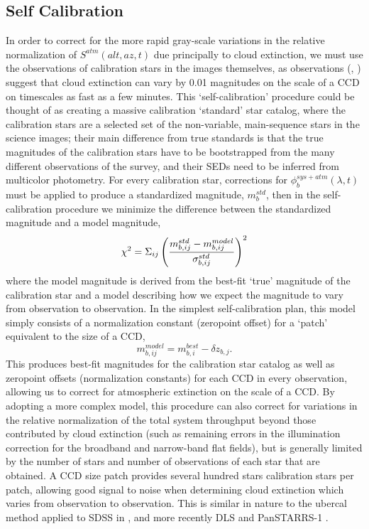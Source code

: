 \documentclass[12pt,preprint]{aastex}
\begin{document}
\subsection{Self Calibration}
In order to correct for the more rapid gray-scale variations in the
relative normalization of $S^{atm}(alt,az,t)$ due principally to cloud extinction,
we must use the observations of calibration stars in the images themselves, as
 observations (\citep{Burke13}, \citep{Ivezic2007}) suggest that cloud extinction can vary by 0.01 magnitudes on the scale of a CCD
on timescales as fast as a few minutes. This
`self-calibration' procedure could be thought of as creating a massive
calibration `standard' star catalog, where the calibration stars are
a selected set of the non-variable, main-sequence stars in the science images;
their main difference from true standards is that the true magnitudes of the calibration
stars have to be bootstrapped from the many different observations of
the survey, and their SEDs need to be inferred from multicolor photometry.
For every calibration star, corrections for
 $\phi_b^{sys+atm}(\lambda,t)$ must be
applied to produce a standardized magnitude, $m_b^{std}$, then in the
self-calibration procedure we minimize the difference between the
standardized magnitude and a model magnitude,
\begin{equation}
\label{eqn:chi2}
\chi^2 = \Sigma_{ij} \left( { m_{b,ij}^{std} - m_{b,ij}^{model} \over
\sigma_{b,ij}^{std} } \right)^2
\end{equation}
where the model magnitude is derived from the best-fit `true'
magnitude of the calibration star and a model describing how we expect
the magnitude to vary from observation to observation. In the simplest
self-calibration plan, this model simply consists of a normalization constant
(zeropoint offset) for a `patch' equivalent to the size of a CCD,
\begin{equation}
\label{eqn:modelmag}
m_{b,ij}^{model} = m_{b,i}^{best} - \delta z_{b,j}.
\end{equation}
This produces best-fit magnitudes for the calibration star catalog as
well as zeropoint offsets (normalization constants) for each CCD in
every observation, allowing us to correct for atmospheric extinction
on the scale of a CCD. By adopting a more complex model, this
procedure can also correct for variations in the relative
normalization of the total system throughput beyond those contributed
by cloud extinction (such as remaining errors in the illumination
correction for the broadband and narrow-band flat fields), but is
generally limited by the number of stars and number of observations of
each star that are obtained. A CCD size patch provides several hundred stars
calibration stars per patch, allowing good signal to noise when determining cloud
extinction which varies from observation to observation.
This is similar in
nature to the ubercal method applied to SDSS in
\citet{Padmanabhan2008}, and more recently DLS \citep{Wittman2012} and PanSTARRS-1 \citep{Schlafly2012}.
\end{document}
